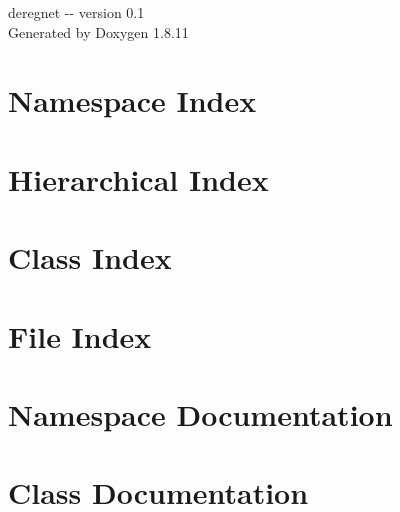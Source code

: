 \documentclass[twoside]{book}
\newcommand{\+}{\discretionary{\mbox{\scriptsize$\hookleftarrow$}}{}{}}
\newcommand{\clearemptydoublepage}{%
  \newpage{\pagestyle{empty}\cleardoublepage}%
}
\begin{document}
\hypersetup{pageanchor=false,
             bookmarksnumbered=true,
             pdfencoding=unicode
            }
\begin{titlepage}
\vspace*{7cm}
\begin{center}%
{\Large deregnet -\/-\/ version 0.1 }\\
\vspace*{1cm}
{\large Generated by Doxygen 1.8.11}\\
\end{center}
\end{titlepage}
\clearemptydoublepage
\tableofcontents
\clearemptydoublepage
{}
\hypersetup{pageanchor=true}

\chapter{Namespace Index}

\chapter{Hierarchical Index}

\chapter{Class Index}

\chapter{File Index}

\chapter{Namespace Documentation}

\chapter{Class Documentation}


















\end{document}
